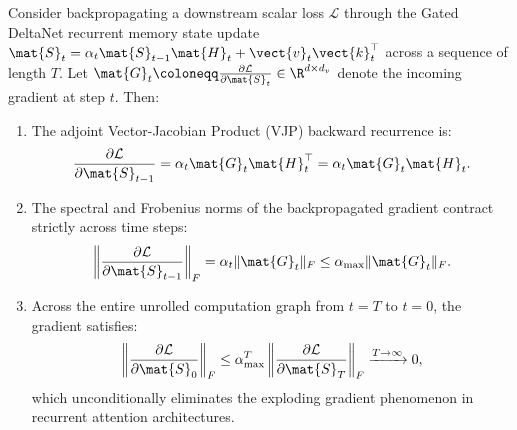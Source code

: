 \begin{lemma}
\label{lem:autograd_vjp_deltanet}
Consider backpropagating a downstream scalar loss $\mathcal{L}$ through the Gated DeltaNet recurrent memory state update $\mat{S}_t = \alpha_t \mat{S}_{t-1} \mat{H}_t + \vect{v}_t \vect{k}_t^\top$ across a sequence of length $T$.
Let $\mat{G}_t \coloneqq \frac{\partial \mathcal{L}}{\partial \mat{S}_t} \in \R^{d \times d_v}$ denote the incoming gradient at step $t$.
Then:
\begin{enumerate}
    \item The adjoint Vector-Jacobian Product (VJP) backward recurrence is:
    \begin{equation}
    \frac{\partial \mathcal{L}}{\partial \mat{S}_{t-1}} = \alpha_t \mat{G}_t \mat{H}_t^\top = \alpha_t \mat{G}_t \mat{H}_t.
    \label{eq:deltanet_backward_vjp}
    \end{equation}
    \item The spectral and Frobenius norms of the backpropagated gradient contract strictly across time steps:
    \begin{equation}
    \left\| \frac{\partial \mathcal{L}}{\partial \mat{S}_{t-1}} \right\|_F = \alpha_t \|\mat{G}_t\|_F \le \alpha_{\max} \|\mat{G}_t\|_F.
    \label{eq:backward_gradient_contraction}
    \end{equation}
    \item Across the entire unrolled computation graph from $t=T$ to $t=0$, the gradient satisfies:
    \begin{equation}
    \left\| \frac{\partial \mathcal{L}}{\partial \mat{S}_0} \right\|_F \le \alpha_{\max}^T \left\| \frac{\partial \mathcal{L}}{\partial \mat{S}_T} \right\|_F \xrightarrow{T \to \infty} 0,
    \label{eq:backward_gradient_zero_limit}
    \end{equation}
    which unconditionally eliminates the exploding gradient phenomenon in recurrent attention architectures.
\end{enumerate}
\end{lemma}

